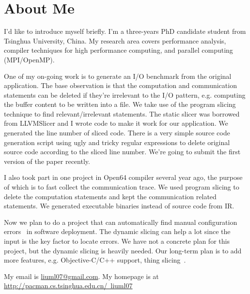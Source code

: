\documentclass[DIV=calc, paper=a4, fontsize=11pt, twocolumn]{scrartcl}
\begin{document}
\section*{About Me}
I'd like to introduce myself briefly.
I'm a three-years PhD candidate student from Tsinghua University, China.
My research area covers performance analysis, compiler techniques for high performance computing, and parallel computing (MPI/OpenMP). 

One of my on-going work is to generate an I/O benchmark from the original application.
The base observation is that the computation and communication statements can be deleted if they're irrelevant to the I/O pattern,
e.g. computing the buffer content to be written into a file.
We take use of the program slicing technique to find relevant/irrelevant statements.
The static slicer was borrowed from LLVMSlicer and I wrote code to make it work for our application.
We generated the line number of sliced code.
There is a very simple source code generation script using ugly and tricky regular expressions to delete original source code according to the sliced line number.
We're going to submit the first version of the paper recently.

I also took part in one project in Open64 compiler several year ago,
the purpose of which is to fast collect the communication trace.
We used program slicing to delete the computation statements and kept the communication related statements.
We generated executable binaries instead of source code from IR.

Now we plan to do a project that can automatically find manual configuration errors~\cite{yin2011empirical} in software deployment.
The dynamic slicing can help a lot since the input is the key factor to locate errors.
We have not a concrete plan for this project, but the dynamic slicing is heavily needed.
Our long-term plan is to add more features, e.g. Objective-C/C++ support, thing slicing~\cite{sridharan2007thin}.

My email is \href{liuml07@gmail.com}{liuml07@gmail.com}.
My homepage is at \href{http://pacman.cs.tsinghua.edu.cn/\~liuml07}{http://pacman.cs.tsinghua.edu.cn/\string~liuml07}


 
\end{document}
